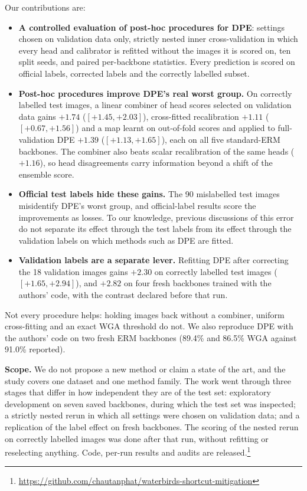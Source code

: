 Our contributions are:
\begin{itemize}
\item \textbf{A controlled evaluation of post-hoc procedures for DPE}: settings chosen on validation data only, strictly nested inner cross-validation in which every head and calibrator is refitted without the images it is scored on, ten split seeds, and paired per-backbone statistics. Every prediction is scored on official labels, corrected labels and the correctly labelled subset.
\item \textbf{Post-hoc procedures improve DPE's real worst group.} On correctly labelled test images, a linear combiner of head scores selected on validation data gains $+1.74$\pp{} ($[+1.45,+2.03]$), cross-fitted recalibration $+1.11$\pp{} ($[+0.67,+1.56]$) and a map learnt on out-of-fold scores and applied to full-validation DPE $+1.39$\pp{} ($[+1.13,+1.65]$), each on all five standard-ERM backbones. The combiner also beats scalar recalibration of the same heads ($+1.16$\pp), so head disagreements carry information beyond a shift of the ensemble score.
\item \textbf{Official test labels hide these gains.} The 90 mislabelled test images misidentify DPE's worst group, and official-label results score the improvements as losses. To our knowledge, previous discussions of this error \cite{sagawa2020code,asgari2022masktune} do not separate its effect through the test labels from its effect through the validation labels on which methods such as DPE are fitted.
\item \textbf{Validation labels are a separate lever.} Refitting DPE after correcting the 18 validation images gains $+2.30$\pp{} on correctly labelled test images ($[+1.65,+2.94]$), and $+2.82$\pp{} on four fresh backbones trained with the authors' code, with the contrast declared before that run.
\end{itemize}
Not every procedure helps: holding images back without a combiner, uniform cross-fitting and an exact WGA threshold do not. We also reproduce DPE with the authors' code on two fresh ERM backbones (89.4\% and 86.5\% WGA against 91.0\% reported).

\textbf{Scope.} We do not propose a new method or claim a state of the art, and the study covers one dataset and one method family. The work went through three stages that differ in how independent they are of the test set: exploratory development on seven saved backbones, during which the test set was inspected; a strictly nested rerun in which all settings were chosen on validation data; and a replication of the label effect on fresh backbones. The scoring of the nested rerun on correctly labelled images was done after that run, without refitting or reselecting anything. Code, per-run results and audits are released.\footnote{\url{https://github.com/chautanphat/waterbirds-shortcut-mitigation}}
